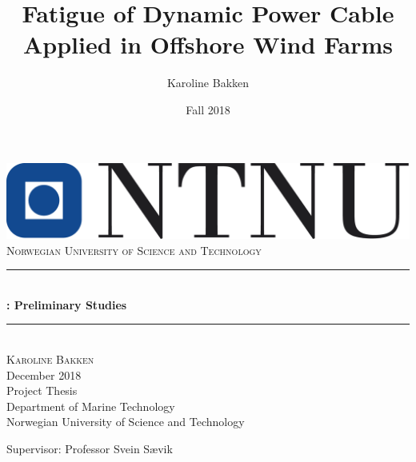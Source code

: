 \documentclass{report}
\title{Fatigue of Dynamic Power Cable Applied in Offshore Wind Farms}								%
\author{Karoline Bakken}								%
\date{Fall 2018}											%
\makeatletter
\let\thetitle\@title
\makeatother
\begin{document}
\begin{titlepage}
	\centering
    \vspace*{0.5 cm}
    \includegraphics[scale = 0.3]{figures/ntnuu}\\[1.0 cm]	%
    \textsc{\LARGE Norwegian University of Science \newline\newline and Technology}\\[2.0 cm]	%
	\rule{\linewidth}{0.2 mm} \\[0.4 cm]
	{\huge \bfseries \thetitle: Preliminary Studies}\\
	\rule{\linewidth}{0.2 mm} \\[1.5 cm]
	
	\textsc{\Large Karoline Bakken}\\[0.5 cm]
	\Large{December 2018}\\[1.5 cm]
	Project Thesis\\
	Department of Marine Technology \\
	Norwegian University of Science and Technology
	\vfill
		\begin{flushleft} Supervisor: Professor Svein Sævik
		\end{flushleft}
	 
	 
	 

    
    
    
    
	
\end{titlepage}
\end{document}
